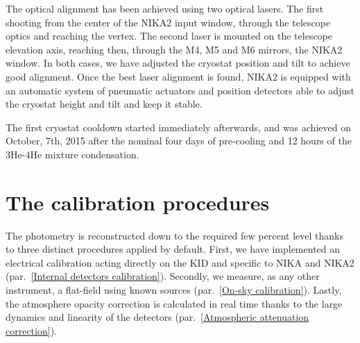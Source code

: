 \documentclass[]{aa} %
\begin{document}
The optical alignment has been achieved using two optical lasers. The first shooting from the center of the NIKA2 input window, through the telescope optics and reaching the vertex. The second laser is mounted on the telescope elevation axis, reaching then, through the M4, M5 and M6 mirrors, the NIKA2 window. In both cases, we have adjusted the cryostat position and tilt to achieve good alignment. Once the best laser alignment is found, NIKA2 is equipped with an automatic system of pneumatic actuators and position detectors able to adjust the cryostat height and tilt and keep it stable. 

The first cryostat cooldown started immediately afterwards, and was achieved on October, 7th, 2015 after the nominal four days of pre-cooling and 12 hours of the 3He-4He mixture condensation. 





\section{The calibration procedures}

The photometry is reconstructed down to the required few percent level thanks to three distinct procedures applied by default. First, we have implemented an electrical calibration acting directly on the KID and specific to NIKA and NIKA2 (par.~\ref{Internal detectors calibration}). Secondly, we measure, as any other instrument, a flat-field using known sources (par.~\ref{On-sky calibration}). Lastly, the atmosphere opacity correction is calculated in real time thanks to the large dynamics and linearity of the detectors (par.~\ref{Atmospheric attenuation correction}).
\end{document}

